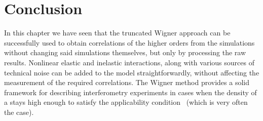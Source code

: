 \section{Conclusion}

In this chapter we have seen that the truncated Wigner approach can be successfully used to obtain correlations of the higher orders from the simulations without changing said simulations themselves, but only by processing the raw results.
Nonlinear elastic and inelastic interactions, along with various sources of technical noise can be added to the model straightforwardly, without affecting the measurement of the required correlations.
The Wigner method provides a solid framework for describing  interferometry experiments in cases when the density of a  stays high enough to satisfy the applicability condition~ (which is very often the case).
